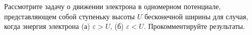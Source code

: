 \documentclass[__main__.tex]{subfiles}
\begin{document}
Рассмотрите задачу о движении электрона в одномерном потенциале, представляющем собой ступеньку высоты $U$ бесконечной ширины для случая, когда энергия электрона (а) $\varepsilon>U$, (б) $\varepsilon<U$. Прокомментируйте результаты.\\ 

\end{document}
